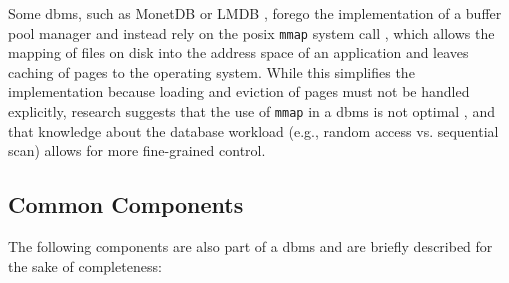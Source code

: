 Some \acrshort{dbms}, such as MonetDB \cite{Boncz:2008Breaking} or LMDB \cite{Henry:2019Howard}, forego the implementation of a buffer pool manager and instead rely on the \acrshort{posix} \texttt{mmap} system call \cite{Stonebraker:1981Operating}, which allows the mapping of files on disk into the address space of an application and leaves caching of pages to the operating system. While this simplifies the implementation because loading and eviction of pages must not be handled explicitly, research suggests that the use of \texttt{mmap} in a \acrshort{dbms} is not optimal \cite{Crotty:2022Are}, and that knowledge about the database workload (e.g., random access vs. sequential scan) allows for more fine-grained control.

\subsection{Common Components}

The following components are also part of a \acrshort{dbms} and are briefly described for the sake of completeness:

